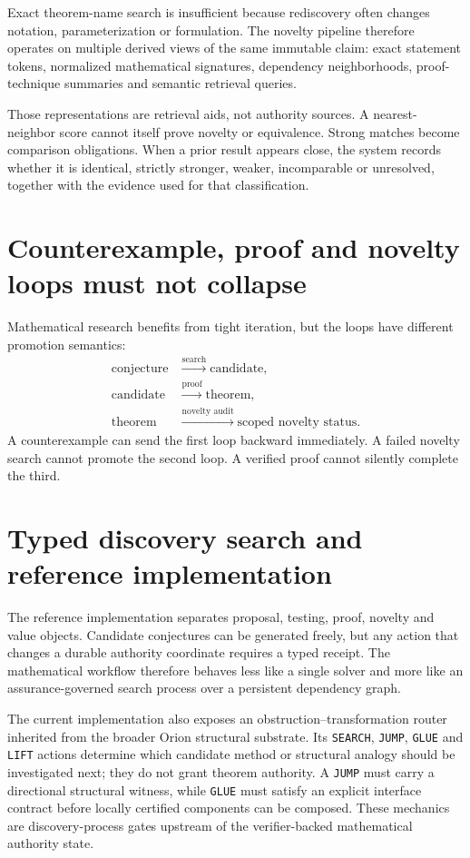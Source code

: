 \documentclass[11pt]{article}
\begin{document}
Exact theorem-name search is insufficient because rediscovery often changes notation, parameterization or formulation. The novelty pipeline therefore operates on multiple derived views of the same immutable claim: exact statement tokens, normalized mathematical signatures, dependency neighborhoods, proof-technique summaries and semantic retrieval queries.

Those representations are retrieval aids, not authority sources. A nearest-neighbor score cannot itself prove novelty or equivalence. Strong matches become comparison obligations. When a prior result appears close, the system records whether it is identical, strictly stronger, weaker, incomparable or unresolved, together with the evidence used for that classification.

\section{Counterexample, proof and novelty loops must not collapse}

Mathematical research benefits from tight iteration, but the loops have different promotion semantics:
\begin{align*}
\text{conjecture}&\xrightarrow{\text{search}}\text{candidate},\\
\text{candidate}&\xrightarrow{\text{proof}}\text{theorem},\\
\text{theorem}&\xrightarrow{\text{novelty audit}}\text{scoped novelty status}.
\end{align*}
A counterexample can send the first loop backward immediately. A failed novelty search cannot promote the second loop. A verified proof cannot silently complete the third.

\section{Typed discovery search and reference implementation}

The reference implementation separates proposal, testing, proof, novelty and value objects. Candidate conjectures can be generated freely, but any action that changes a durable authority coordinate requires a typed receipt. The mathematical workflow therefore behaves less like a single solver and more like an assurance-governed search process over a persistent dependency graph.

The current implementation also exposes an obstruction--transformation router inherited from the broader Orion structural substrate. Its \texttt{SEARCH}, \texttt{JUMP}, \texttt{GLUE} and \texttt{LIFT} actions determine which candidate method or structural analogy should be investigated next; they do not grant theorem authority. A \texttt{JUMP} must carry a directional structural witness, while \texttt{GLUE} must satisfy an explicit interface contract before locally certified components can be composed. These mechanics are discovery-process gates upstream of the verifier-backed mathematical authority state.
\end{document}
